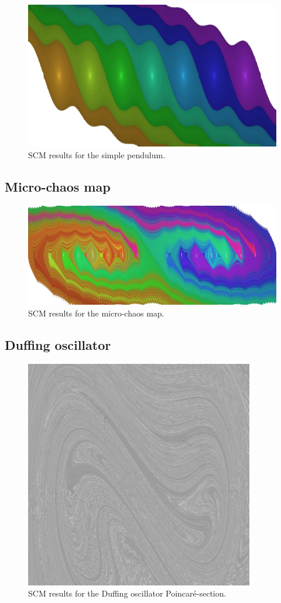 \documentclass[11pt]{article}
\begin{document}
\begin{figure}[h]
	\centering
	\includegraphics[width=12cm]{fig/pendulum.jpg}
	\caption{SCM results for the simple pendulum.}
\end{figure}


\subsection{Micro-chaos map}

\begin{figure}[h]
	\centering
	\includegraphics[width=12cm]{fig/microchaos.jpg}
	\caption{SCM results for the micro-chaos map.}
\end{figure}

\subsection{Duffing oscillator}

\begin{figure}[h]
	\centering
	\includegraphics[width=10cm]{fig/duffing.jpg}
	\caption{SCM results for the Duffing oscillator Poincaré-section.}
\end{figure}
\end{document}
